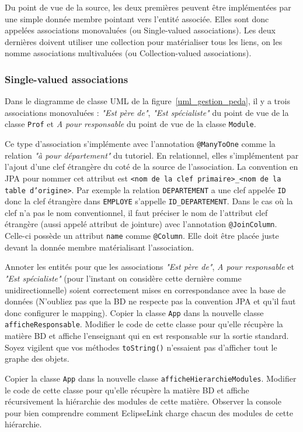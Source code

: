 \documentclass[a4paper,11pt]{article}
\begin{document}
Du point de vue de la source, les deux premières peuvent être implémentées par une simple donnée membre pointant vers 
l'entité associée. Elles sont donc appelées associations monovaluées (ou Single-valued associations). Les deux 
dernières doivent utiliser une collection pour matérialiser tous les liens, on les nomme associations multivaluées 
(ou Collection-valued associations).
\subsubsection{Single-valued associations}
Dans le diagramme de classe UML de la figure~\ref{uml_gestion_peda}, il y a trois associations monovaluées : \textit{"Est père de"}, 
\textit{"Est spécialiste"} du point de vue de la classe \texttt{Prof} et \textit{A pour responsable} du point de 
vue de la classe \texttt{Module}.

Ce type d'association s'implémente avec l'annotation \texttt{@ManyToOne} comme la relation \textit{"à pour département"} 
du tutoriel. En relationnel, elles s'implémentent par l'ajout d'une clef étrangère du coté de la source de l'association.
La convention en JPA pour nommer cet attribut est \texttt{<nom de la clef primaire>\_<nom de la table d'origine>}. Par 
exemple la relation \texttt{DEPARTEMENT} a une clef appelée \texttt{ID} donc la clef étrangère dans \texttt{EMPLOYE} 
s'appelle \texttt{ID\_DEPARTEMENT}. Dans le cas où la clef n'a pas le nom conventionnel, il faut préciser le nom de 
l'attribut clef étrangère (aussi appelé attribut de jointure) avec l'annotation \texttt{@JoinColumn}. Celle-ci possède un 
attribut \texttt{name} comme \texttt{@Column}. Elle doit être placée juste devant la donnée membre matérialisant l'association. 

\Question Annoter les entités pour que les associations \textit{"Est père de"}, \textit{A pour responsable} et 
\textit{"Est spécialiste"} (pour l'instant on considère cette dernière comme unidirectionnelle) soient correctement mises en correspondance avec la base de données (N'oubliez pas que la BD ne respecte pas la convention JPA et qu'il faut donc configurer le mapping).
\Question  Copier la classe \texttt{App} dans la nouvelle classe \texttt{afficheResponsable}. Modifier le code de cette classe 
pour qu'elle récupère la matière BD et affiche l'enseignant qui en est responsable sur la sortie standard. Soyez vigilent
que vos méthodes \texttt{toString()} n'essaient pas d'afficher tout le graphe des objets.

\Question  Copier la classe \texttt{App} dans la nouvelle classe \texttt{afficheHierarchieModules}. Modifier le code de 
cette classe pour qu'elle récupère la matière BD et affiche récursivement la hiérarchie des modules de cette matière. 
Observer la console pour bien comprendre comment EclipseLink charge chacun des modules de cette hiérarchie.
\end{document}
